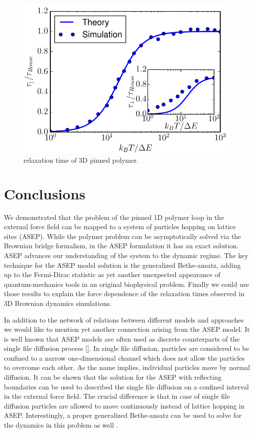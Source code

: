 \documentclass[aps,showpacs,twocolumn,floatfix,prx,superscriptaddress]{revtex4-1}
\begin{document}
\begin{figure}[htpb]
    \centering
    \includegraphics[width=1.0\linewidth]{relaxation3D}
    \caption{relaxation time of 3D pinned polymer.}
    \label{fig:relaxation3D}
\end{figure}
 
\section{Conclusions}
We demonstrated that the problem of the pinned 1D polymer loop in the external force field can be mapped to a system of particles hopping on lattice sites (ASEP). While the polymer problem can be asymptotically solved via the Brownian bridge formalism, in the ASEP formulation it has an exact solution. ASEP advances our understanding of the system to the dynamic regime. The key technique for the ASEP model solution is the generalized Bethe-ansatz, adding up to the Fermi-Dirac statistic as yet another unexpected appearance of quantum-mechanics tools in an original biophysical problem. Finally we could use those results to explain the force dependence of the relaxation times observed in 3D Brownian dynamics simulations.

In addition to the network of relations between different models and approaches we would like to mention yet another connection arising from the ASEP model. It is well known that ASEP models are often used as discrete counterparts of the single file diffusion process []. In single file diffusion, particles are considered to be confined to a narrow one-dimensional channel which does not allow the particles to overcome each other. As the name implies, individual particles move by normal diffusion. It can be shown that the solution for the ASEP with reflecting boundaries can be used to described the single file diffusion on a confined interval in the external force field. The crucial difference is that in case of single file diffusion particles are allowed to move continuously instead of lattice hopping in ASEP. Interestingly, a proper generalized Bethe-ansatz can be used to solve for the dynamics in this problem as well \cite{}. 
\end{document}

